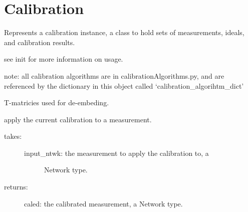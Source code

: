\documentclass[letterpaper,10pt,english]{sphinxmanual}
\begin{document}
\section{Calibration}
\label{auto_calibration::doc}\label{auto_calibration:calibration}

\begin{fulllineitems}
\label{auto_calibration:mwavepy.Calibration}
Represents a calibration instance, a class to hold sets
of measurements, ideals, and calibration results.

see init for more information on usage.

note:
all calibration algorithms are in calibrationAlgorithms.py, and are
referenced by the dictionary in this object called
`calibration\_algorihtm\_dict'

\begin{fulllineitems}
\label{auto_calibration:mwavepy.Calibration.Ts}
T-matricies used for de-embeding.

\end{fulllineitems}


\begin{fulllineitems}
\label{auto_calibration:mwavepy.Calibration.apply_cal}
apply the current calibration to a measurement.
\begin{description}
\item[{takes:}] \leavevmode\begin{description}
\item[{input\_ntwk: the measurement to apply the calibration to, a}] \leavevmode
Network type.

\end{description}

\item[{returns:}] \leavevmode
caled: the calibrated measurement, a Network type.

\end{description}

\end{fulllineitems}


\end{fulllineitems}
\end{document}
